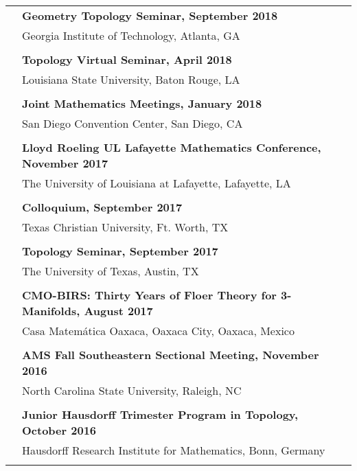 \documentclass[letterpaper,11pt,oneside]{article}
\begin{document}
                  \begin{tabular}{@{} l l}
       & \textbf{Geometry Topology Seminar, September 2018} \\
     & Georgia Institute of Technology, Atlanta, GA\\
     
 &  \\
       & \textbf{Topology Virtual Seminar, April 2018 } \\
     & Louisiana State University, Baton Rouge, LA\\
     & \\
     &\textbf{Joint Mathematics Meetings, January 2018} \\
     &  San Diego Convention Center, San Diego, CA\\
     & \\
     &\textbf{Lloyd Roeling UL Lafayette Mathematics Conference, November 2017} \\
     &  The University of Louisiana at Lafayette, Lafayette, LA \\
     & \\

     &\textbf{Colloquium, September 2017} \\
     & Texas Christian University, Ft. Worth, TX \\
     & \\
     


     &\textbf{Topology Seminar, September 2017} \\
     &  The University of Texas, Austin, TX \\
     & \\
 

     &\textbf{CMO-BIRS: Thirty Years of Floer Theory for 3-Manifolds, August 2017 } \\
     &  Casa Matem\'{a}tica Oaxaca, Oaxaca City, Oaxaca, Mexico\\
     & \\
 

     &\textbf{AMS Fall Southeastern Sectional Meeting, November 2016 } \\
     &  North Carolina State University, Raleigh, NC \\
     & \\
     

     &\textbf{Junior Hausdorff Trimester Program in Topology, October 2016 } \\
     &  Hausdorff Research Institute for Mathematics, Bonn, Germany \\
     & \\


\end{tabular}
\end{document}
